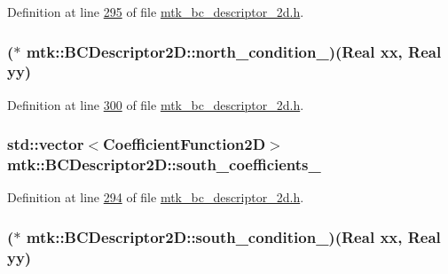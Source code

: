 Definition at line \hyperlink{mtk__bc__descriptor__2d_8h_source_l00295}{295} of file \hyperlink{mtk__bc__descriptor__2d_8h_source}{mtk\+\_\+bc\+\_\+descriptor\+\_\+2d.\+h}.

\hypertarget{classmtk_1_1BCDescriptor2D_a23e0b9ae755dcf81841aa24ddaf0b090}{
\subsubsection[{north\+\_\+condition\+\_\+}]{($\ast$ mtk\+::\+B\+C\+Descriptor2\+D\+::north\+\_\+condition\+\_\+)({\bf Real} xx, {\bf Real} yy)\hspace{0.3cm}{\ttfamily [private]}}}\label{classmtk_1_1BCDescriptor2D_a23e0b9ae755dcf81841aa24ddaf0b090}


Definition at line \hyperlink{mtk__bc__descriptor__2d_8h_source_l00300}{300} of file \hyperlink{mtk__bc__descriptor__2d_8h_source}{mtk\+\_\+bc\+\_\+descriptor\+\_\+2d.\+h}.

\hypertarget{classmtk_1_1BCDescriptor2D_a263309b9ad288dc89826d818d9378d07}{
\subsubsection[{south\+\_\+coefficients\+\_\+}]{\setlength{\rightskip}{0pt plus 5cm}std\+::vector$<${\bf Coefficient\+Function2\+D}$>$ mtk\+::\+B\+C\+Descriptor2\+D\+::south\+\_\+coefficients\+\_\+\hspace{0.3cm}{\ttfamily [private]}}}\label{classmtk_1_1BCDescriptor2D_a263309b9ad288dc89826d818d9378d07}


Definition at line \hyperlink{mtk__bc__descriptor__2d_8h_source_l00294}{294} of file \hyperlink{mtk__bc__descriptor__2d_8h_source}{mtk\+\_\+bc\+\_\+descriptor\+\_\+2d.\+h}.

\hypertarget{classmtk_1_1BCDescriptor2D_a2a933b473abbe47ad7c79ef7939e7768}{
\subsubsection[{south\+\_\+condition\+\_\+}]{($\ast$ mtk\+::\+B\+C\+Descriptor2\+D\+::south\+\_\+condition\+\_\+)({\bf Real} xx, {\bf Real} yy)\hspace{0.3cm}{\ttfamily [private]}}}\label{classmtk_1_1BCDescriptor2D_a2a933b473abbe47ad7c79ef7939e7768}


